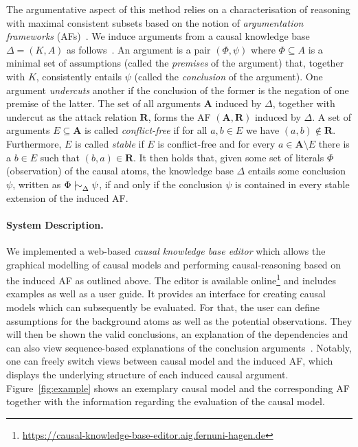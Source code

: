 \documentclass{IOS-Book-Article}
\newcommand{\attrel}{\mathbf{R}}
\newcommand{\snake}{\mathrel\vert\mathrel{\mkern-3mu}\sim}
\newcommand{\nc}[2]{\snake^{#1}_{#2}}
\newcommand{\args}{\mathbf{A}}
\begin{document}
The argumentative aspect of this method relies on a characterisation of reasoning with maximal consistent subsets based on the notion of \emph{argumentation frameworks} (AFs)~\cite{DBLP:journals/ai/Dung95,DBLP:conf/ijcai/Cayrol95}.
We induce arguments from a causal knowledge base $\Delta=(K,A)$ as follows~\cite{DBLP:conf/ijcai/Cayrol95}.
An argument is a pair $(\Phi, \psi)$ where $\Phi \subseteq A$ is a minimal set of assumptions (called the \emph{premises} of the argument) that, together with $K$, consistently entails $\psi$ (called the \emph{conclusion} of the argument). 
One argument \emph{undercuts} another if the conclusion of the former is the negation of one premise of the latter.
The set of all arguments $\args$ induced by $\Delta$, together with undercut as the attack relation $\attrel$, forms the AF $(\args, \attrel)$ induced by $\Delta$.
A set of arguments $E\subseteq \args$ is called \emph{conflict-free} if for all $a,b \in E$ we have $(a,b)\notin\attrel$.
Furthermore, $E$ is called \emph{stable} if $E$ is conflict-free and for every $a \in \args \setminus E$ there is a $b \in E$ such that $(b,a)\in\attrel$.
It then holds that, given some set of literals $\Phi$ (observation) of the causal atoms, the knowledge base $\Delta$ entails some conclusion $\psi$, written as $\Phi \nc{}{\Delta} \psi$, if and only if the conclusion $\psi$ is contained in every stable extension of the induced AF.


\paragraph{System Description.}

We implemented a web-based \emph{causal knowledge base editor} which allows the graphical modelling of causal models and performing causal-reasoning based on the induced AF as outlined above.
The editor is available online\footnote{\url{https://causal-knowledge-base-editor.aig.fernuni-hagen.de}}
and includes examples as well as a user guide.
It provides an interface for creating causal models which can subsequently be evaluated.
For that, the user can define assumptions for the background atoms as well as the potential observations.
They will then be shown the valid conclusions, an explanation of the dependencies and can also view sequence-based explanations of the conclusion arguments~\cite{conf/kr/BengelT25}.
Notably, one can freely switch views between causal model and the induced AF, which displays the underlying structure of each induced causal argument.
Figure~\ref{fig:example} shows an exemplary causal model and the corresponding AF together with the information regarding the evaluation of the causal model.
\end{document}
